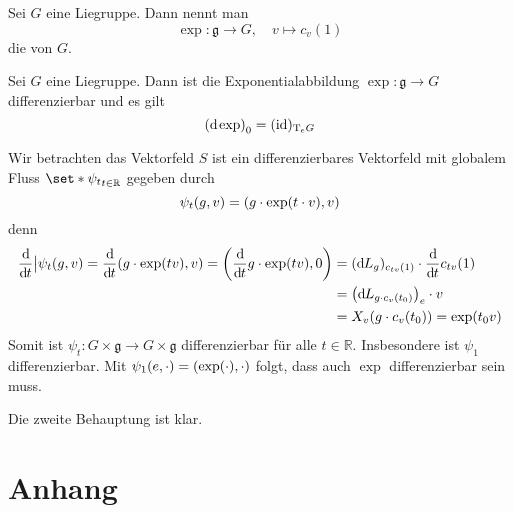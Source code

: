 \begin{definition}
	Sei $G$ eine Liegruppe.
	Dann nennt man 
	\[
		\exp \colon \mathfrak{g} \longrightarrow G ,\quad  v \longmapsto c_v(1)
	\]
	die  von $G$. 
\end{definition}

\begin{lemma}
	Sei $G$ eine Liegruppe.
	Dann ist die Exponentialabbildung $\exp \colon \mathfrak{g} \to G$ differenzierbar und es gilt 
	\[
		\enbrace*{\mathd \exp}_0 = (\id)_{\Tmap_e G}
	\]
\end{lemma}
\begin{beweis}
	Wir betrachten das Vektorfeld
	$S$ ist ein differenzierbares Vektorfeld mit globalem Fluss $\set*{\psi_t}_{t \in \mathbb{R}}$ gegeben durch 
	\[
		\psi_t(g,v) = \enbrace*{g \cdot \exp(t \cdot v),v}
	\]
	denn
	\begin{align}
		\diffd{}{t}\big| \psi_t (g,v) = \diffd{}{t} \enbrace*{g \cdot \exp(tv),v} = \enbrace*{\diffd{}{t} g \cdot \exp(tv),0} &= (\mathd L_g)_{c_{tv}(1)} \cdot \diffd{}{t} c_{tv}(1) \\
		&= \enbrace*{\mathd L_{g \cdot c_v(t_0)}}_e \cdot v \\
		&= X_v \enbrace*{g \cdot c_v(t_0)} = \exp(t_0 v)
	\end{align}
	Somit ist $\psi_t \colon G \times \mathfrak{g} \to G \times \mathfrak{g}$ differenzierbar für alle $t \in \mathbb{R}$.
	Insbesondere ist $\psi_1$ differenzierbar.
	Mit $\psi_1(e,\cdot ) = \enbrace*{\exp(\cdot ), \cdot }$ folgt, dass auch $\exp$ differenzierbar sein muss.
	
	Die zweite Behauptung ist klar.
\end{beweis}


\cleardoubleoddemptypage
{}
\setcounter{page}{1}
\cleardoubleoddemptypage
\appendix

\chapter{Anhang} %
\label{sec:anhang}

\printindex
\printbibliography
\listoffigures
\todototoc
{}

